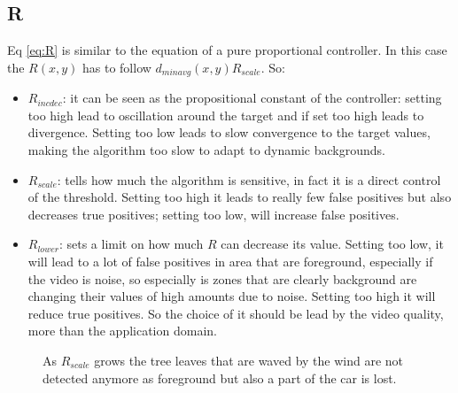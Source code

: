 \subsection*{R}
Eq \ref{eq:R} is similar to the equation of a pure proportional controller.
In this case the $R(x,y)$ has to follow $d_{minavg}(x,y)R_{scale}$. So:
\begin{itemize}
    \item $R_{incdec}$: it can be seen as the propositional constant of the controller: setting too high lead to oscillation around the target and if set too high leads to divergence. Setting too low leads to slow convergence to the target values, making the algorithm too slow to adapt to dynamic backgrounds.
    \item $R_{scale}$: tells how much the algorithm is sensitive, in fact it is a direct
    control of the threshold. Setting too high it leads to really few false positives
    but also decreases true positives; setting too low, will increase false positives.
    \item $R_{lower}$: sets a limit on how much $R$ can decrease its value. Setting too
    low, it will lead to a lot of false positives in area that are foreground,
    especially if the video is noise, so especially is zones that are clearly
    background are changing their values of high amounts due to noise. Setting too
    high it will reduce true positives. So the choice of it should be lead by the
    video quality, more than the application domain.
\end{itemize}
\begin{figure}[!t]
    \centering
    \newline
    \newline
    \caption{As $R_{scale}$ grows the tree leaves that are waved by the wind are not detected
anymore as foreground but also a part of the car is lost.}
\end{figure}

